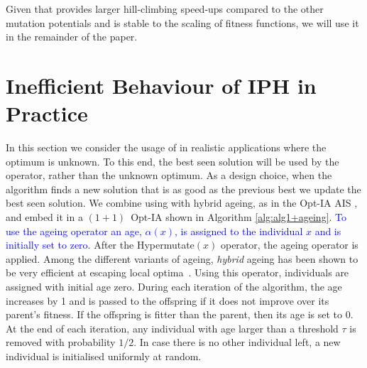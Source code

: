 \documentclass[lettersize,journal]{IEEEtran}
\newcommand{\new}[1]{\textcolor{blue}{#1}}
\begin{document}






Given that {\expoHD } provides larger hill-climbing speed-ups compared to the other mutation potentials and is stable to the scaling of fitness functions,
we will use it in the remainder of the paper.

 	
 	\section{Inefficient Behaviour of IPH in Practice}In this section we consider the usage of  {\expoHD } in realistic applications where the optimum is unknown.
 	To this end, the best seen solution will be used by the operator, rather than the unknown optimum. {\color{blue} As a design choice, when the algorithm finds a new solution that is as good as the previous best we update the best seen solution.}
 	We combine \IPHfcm{} using {\expoHD } with hybrid ageing, as in the Opt-IA AIS \cite{CutelloNicosiaPavoneTimmis2007}, and embed it in a $(1+1)$~Opt-IA shown in Algorithm \ref{alg:alg1+ageing}. \new{To use the ageing operator an age, $\alpha(x)$, is assigned to the individual $x$ and is initially set to zero.} After the Hypermutate$(x)$ operator, %
 	the ageing operator is applied.
 	Among the different variants of ageing, {\it hybrid} ageing has been shown to be very efficient at escaping local optima~\cite{OlivetoSudholt2014ageing,CorusOlivetoYazdaniGECCO2017,CorusOlivetoYazdaniPPSN2018Approx}. Using this operator,  individuals are assigned with initial age zero. During each iteration of the algorithm, the age  increases by 1 and is passed to the offspring if it does not improve over its parent's fitness. If the offspring is fitter than the parent, then its age is set to 0. At the end of each iteration, any individual with age larger than a threshold $\tau$ is removed with probability $1/2$. In case there is no other individual left, a new individual is initialised uniformly at random. 
 
\end{document}
